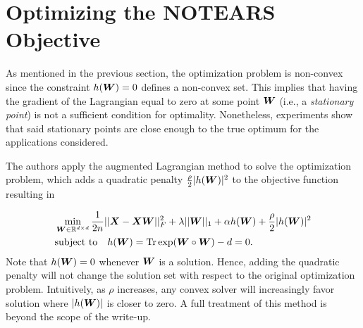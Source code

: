\documentclass[11pt,a4paper]{article}
\begin{document}



\section{Optimizing the NOTEARS Objective}
As mentioned in the previous section, the optimization problem is non-convex since the constraint $h({\bm{W}})=0$ defines a non-convex set.
This implies that having the gradient of the Lagrangian equal to zero at some point ${\bm{W}}$ (i.e., a \emph{stationary point}) is not a sufficient condition for optimality.
Nonetheless, experiments show that said stationary points are close enough to the true optimum for the applications considered.

The authors apply the augmented Lagrangian method to solve the optimization problem, which adds a quadratic penalty $\frac{\rho}{2}|h({\bm{W}})|^2$ to the objective function resulting in

\begin{align}
    &\min_{{\bm{W}} \in \mathbb{R}^{d \times d}} \frac{1}{2n} ||{\bm{X}} - {\bm{X}} {\bm{W}}||_{F}^{2} + \lambda ||{\bm{W}}||_1 + \alpha h({\bm{W}}) + \frac{\rho}{2}|h({\bm{W}})|^2 \\
    &\text{subject to} \quad h({\bm{W}}) = \operatorname{Tr} \exp ({\bm{W}} \circ  {\bm{W}}) - d = 0.
\end{align}
Note that $h({\bm{W}})=0$ whenever ${\bm{W}}$ is a solution. Hence, adding the quadratic penalty will not change the solution set with respect to the original optimization problem.
Intuitively, as $\rho$ increases, any convex solver will increasingly favor solution where $|h({\bm{W}})|$ is closer to zero.
A full treatment of this method is beyond the scope of the write-up.
\end{document}
